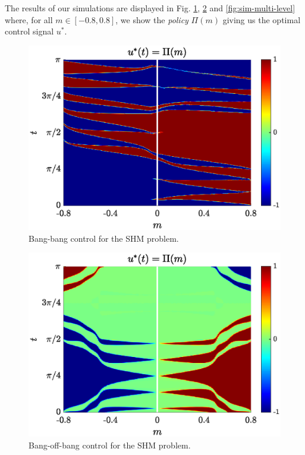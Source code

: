 \documentclass[9pt,shortpaper,twoside,web]{ieeecolor}
\begin{document}
The results of our simulations are displayed in Fig. \ref{fig:sim-bang-bang}, \ref{fig:sim-bang-off-bang} and \ref{fig:sim-multi-level} where, for all $m \in [-0.8,0.8]$, we show the \textit{policy} $\Pi(m)$ giving us the optimal control signal $u^\ast$. 

\begin{figure}[ht!]
	\hspace{0.25em}
	\includegraphics[scale=0.5]{img/fig05.eps}
	\caption{Bang-bang control for the SHM problem.}\label{fig:sim-bang-bang}
\end{figure} 

\begin{figure}[ht!]
	\hspace{0.25em}
	\includegraphics[scale=0.5]{img/fig06.eps}
	\caption{Bang-off-bang control for the SHM problem.}\label{fig:sim-bang-off-bang}
\end{figure} 
\end{document}
